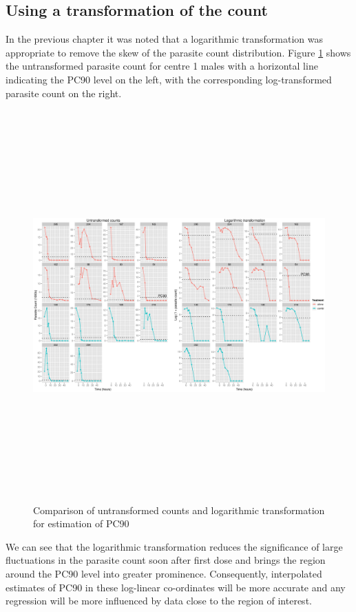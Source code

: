 \subsection{Using a transformation of the count}
In the previous chapter it was noted that a logarithmic transformation was appropriate to remove the skew of the parasite count distribution. Figure \ref{comprawlog} shows the untransformed parasite count for centre 1 males with a horizontal line indicating the PC90 level on the left, with the corresponding log-transformed parasite count on the right.
\begin{figure}
\begin{center}
\includegraphics[height=150mm]{comprawlog90.eps}
\caption{Comparison of untransformed counts and logarithmic transformation for estimation of PC90}
\label{comprawlog}
\end{center}
\end{figure}

We can see that the logarithmic transformation reduces the significance of large fluctuations in the parasite count soon after first dose and brings the region around the PC90 level into greater prominence. Consequently, interpolated estimates of PC90 in these log-linear co-ordinates will be more accurate and any regression will be more influenced by data close to the region of interest.  

